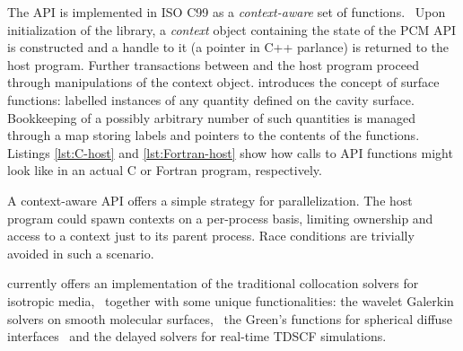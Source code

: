 The \acs{API} is implemented in ISO C99 as a \emph{context-aware} set of
functions.~\autocite{library-ronacher, context-api-example}
Upon initialization of the library, a \emph{context} object containing
the state of the \acs{PCM} \acs{API} is constructed and a handle to it
(a pointer in C++ parlance) is returned to the host program. Further
transactions between \pcmsolver and the host program proceed through
manipulations of the context object.
\pcmsolver introduces the concept of surface functions:
labelled instances of any quantity defined on the cavity surface.
Bookkeeping of a possibly arbitrary number of such quantities is managed
through a map storing labels and pointers to the contents of the
functions.
Listings \ref{lst:C-host} and \ref{lst:Fortran-host} show how calls to
\pcmsolver \acs{API} functions might look like in an actual C or Fortran
program, respectively.



A context-aware \acs{API} offers a simple strategy for parallelization.
The host program could spawn contexts on a per-process basis,
limiting ownership and access to a context just to its parent process.
Race conditions are trivially avoided in such a scenario.



\pcmsolver currently offers an implementation of the traditional collocation
solvers for isotropic media,~\autocite{Tomasi2005-vm}
together with some unique functionalities: the wavelet Galerkin solvers on smooth
molecular surfaces,~\autocite{Weijo2010-hy, Bugeanu2015-tp} the Green’s
functions for spherical diffuse interfaces~\autocite{DiRemigio2016-nn} and
the delayed solvers for real-time \acl{TDSCF}
simulations.~\autocite{Corni2015-pe}

